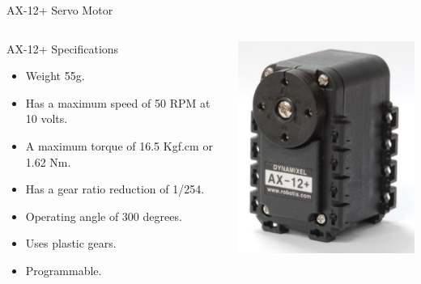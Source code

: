 \documentclass[compress]{beamer}
\begin{document}
\begin{frame}{AX-12+ Servo Motor}

    \begin{columns}
        \begin{column}{0.5\linewidth}
    AX-12+ Specifications

    \begin{itemize}

        \item Weight 55g.
        \item Has a maximum speed of 50 RPM at 10 volts.
        \item A maximum torque of 16.5 Kgf.cm or 1.62 Nm.
        \item Has a gear ratio reduction of 1/254.
        \item Operating angle of 300 degrees.
        \item Uses plastic gears.
        \item Programmable.
    \end{itemize}
            
        \end{column}
        \begin{column}{0.5\linewidth}
            \begin{center}
                \includegraphics[width=0.8\linewidth]{image28}


\end{center}
\end{column}
\end{columns}
\end{frame}
\end{document}
